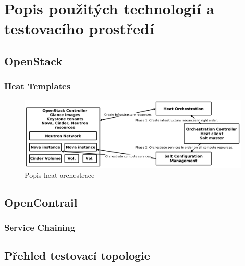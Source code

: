 \chapter{Popis použitých technologií a testovacího prostředí}

\section{OpenStack}\label{sub:interaction}

\subsection{}

\subsection{Heat Templates}

\begin{figure}[h]
\begin{centering}
\includegraphics[scale=0.21]{images/heat}
\par\end{centering}
\caption{Popis heat orchestrace\label{fig:heat}}
\end{figure}

\section{OpenContrail}\label{sub:interaction}

\subsection{Service Chaining}

\section{Přehled testovací topologie}\label{sub:interaction}








